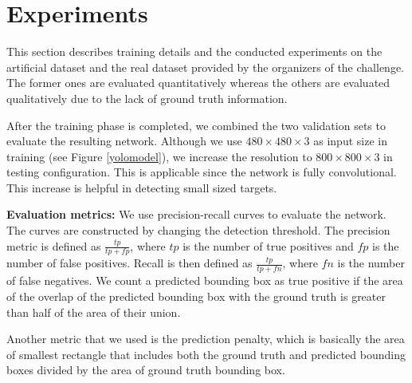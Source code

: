 \documentclass[10pt,twocolumn,letterpaper]{article}
\begin{document}
\section{Experiments}\label{exp}
This section describes training details and the conducted experiments on the artificial dataset and the real dataset provided by the organizers of the challenge. The former ones are evaluated quantitatively whereas the others are evaluated qualitatively due to the lack of ground truth information.
\par%
\par%
After the training phase is completed, we combined the two validation sets to evaluate the resulting network. Although we use $480 \times 480 \times 3$ as input size in training (see Figure \ref{yolomodel}), we increase the resolution to $800 \times 800 \times 3$ in testing configuration. This is applicable since the network is fully convolutional. This increase is helpful in detecting small sized targets.
\par\textbf{Evaluation metrics:} We use precision-recall curves to evaluate the network. The curves are constructed by changing the detection threshold. The precision metric is defined as $\frac{tp}{tp+fp}$, where $tp$ is the number of true positives and $fp$ is the number of false positives. Recall is then defined as $\frac{tp}{tp+fn}$, where $fn$ is the number of false negatives. We count a predicted bounding box as true positive if the area of the overlap of the predicted bounding box with the ground truth is greater than half of the area of their union.

Another metric that we used is the prediction penalty, which is basically the area of smallest rectangle that includes both the ground truth and predicted bounding boxes divided by the area of ground truth bounding box.
\end{document}
